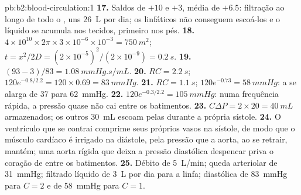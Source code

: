 \begin{solution}{pb:b2:blood-circulation:1}
\textbf{17.} Saldos de $+10$ e $+3$, média de $+6.5$: filtração ao longo
de todo o , uns \qty{26}{L} por dia; os linfáticos não conseguem
escoá-los e o líquido se acumula nos tecidos, primeiro nos pés.
\textbf{18.} $4\times 10^{10}\times 2\pi\times 3\times 10^{-6}\times
10^{-3} = \qty{750}{m^2}$; $t = x^{2}/2D = (2\times 10^{-5})^{2}/
(2\times 10^{-9}) = \qty{0.2}{s}$.
\textbf{19.} $(93 - 3)/83 = \qty{1.08}{mmHg.s/mL}$.
\textbf{20.} $RC = \qty{2.2}{s}$; $120e^{-0.8/2.2} = 120\times 0.69 =
\qty{83}{mmHg}$.
\textbf{21.} $RC = \qty{1.1}{s}$; $120e^{-0.73} = \qty{58}{mmHg}$: a
 se alarga de 37 para \qty{62}{mmHg}.
\textbf{22.} $120e^{-0.3/2.2} = \qty{105}{mmHg}$: numa frequência
rápida, a pressão quase não cai entre os batimentos.
\textbf{23.} $C\Delta P = 2\times 20 = \qty{40}{mL}$ armazenados; os
outros \qty{30}{mL} escoam pelas  durante a própria sístole.
\textbf{24.} O ventrículo que se contrai comprime seus próprios vasos
na sístole, de modo que o músculo cardíaco é irrigado na diástole, pela
pressão que a aorta, ao se retrair, mantém; uma aorta rígida que deixa
a pressão diastólica despencar priva o coração de  entre os
batimentos.
\textbf{25.} Débito de \qty{5}{L/min}; queda arteriolar de
\qty{31}{mmHg}; filtrado líquido de \qty{3}{L} por dia para a linfa;
diastólica de \qty{83}{mmHg} para $C = 2$ e de \qty{58}{mmHg} para
$C = 1$.
\end{solution}
